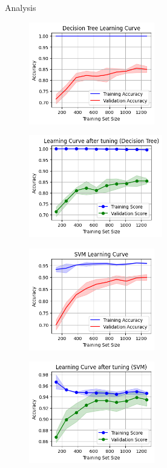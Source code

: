 \documentclass[14pt, aspectratio=169]{beamer}
\begin{document}
\begin{frame}[allowframebreaks]{Analysis}
\begin{adjustwidth}{-0.75cm}{1.25cm}
  \begin{figure}[H]
    \centering
    \begin{minipage}{0.45\textwidth}
        \centering
        \includegraphics[height=12em]{../report/lc_DT.png}
        \label{lc_DT}
    \end{minipage}
    \hfill
    \begin{minipage}{0.45\textwidth}
        \centering
        \includegraphics[height=12em]{../report/lc_tuned_DT.png}
        \label{lc_tuned_DT}
    \end{minipage}
  \end{figure}
  
  \begin{figure}[H]
    \centering
    \begin{minipage}{0.45\textwidth}
        \centering
        \includegraphics[height=12em]{../report/lc_SVM.png}
        \label{lc_SVM}
    \end{minipage}
    \hfill
    \begin{minipage}{0.45\textwidth}
        \centering
        \includegraphics[height=12em]{../report/lc_tuned_SVM.png}
        \label{lc_tuned_SVM}
    \end{minipage}
  \end{figure}
  

\end{adjustwidth}
\end{frame}
\end{document}
